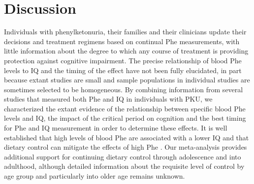 \documentclass{svjour3}                     %
\begin{document}




\section{Discussion} %
\label{sec:Discussion}

Individuals with phenylketonuria, their families and their clinicians update their decisions and treatment regimens based on continual Phe measurements, with little information about the degree to which any course of treatment is providing protection against cognitive impairment. The precise relationship of blood Phe levels to IQ and the timing of the effect have not been fully elucidated, in part because extant studies are small and sample populations in individual studies are sometimes selected to be homogeneous. By combining information from several studies that measured both Phe and IQ in individuals with PKU, we characterized the extant evidence of the relationship between specific blood Phe levels and IQ, the impact of the critical period on cognition and the best timing for Phe and IQ measurement in order to determine these effects. It is well established that high levels of blood Phe are associated with a lower IQ \citep{Waisbren:2007es} and that dietary control can mitigate the effects of high Phe \citep{Weglage:1993wh, Channon:2007ca, Vilaseca:2010tq}. Our meta-analysis provides additional support for continuing dietary control through adolescence and into adulthood, although detailed information about the requisite level of control by age group and particularly into older age remains unknown.
\end{document}
